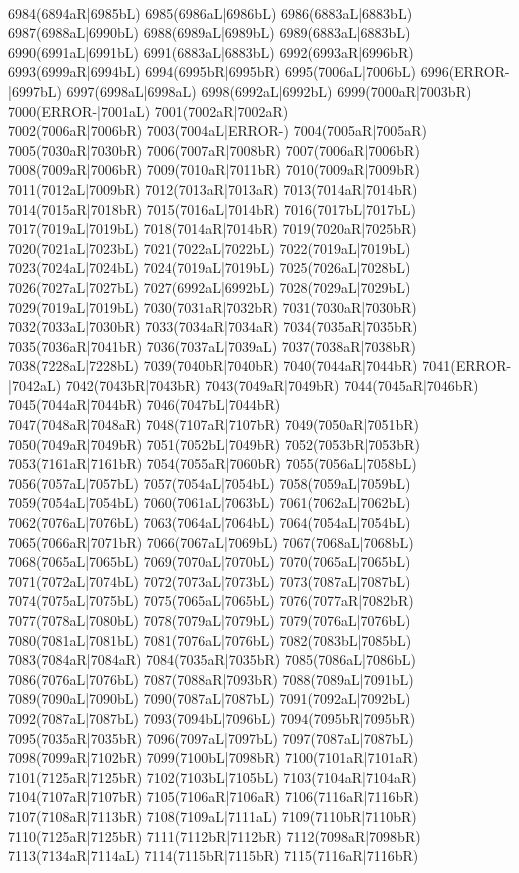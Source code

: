 \\6984(6894aR|6985bL) 6985(6986aL|6986bL) 6986(6883aL|6883bL) 6987(6988aL|6990bL) 6988(6989aL|6989bL) 6989(6883aL|6883bL) 6990(6991aL|6991bL) 6991(6883aL|6883bL) 6992(6993aR|6996bR) \\6993(6999aR|6994bL) 6994(6995bR|6995bR) 6995(7006aL|7006bL) 6996(ERROR-|6997bL) 6997(6998aL|6998aL) 6998(6992aL|6992bL) 6999(7000aR|7003bR) 7000(ERROR-|7001aL) 7001(7002aR|7002aR) \\7002(7006aR|7006bR) 7003(7004aL|ERROR-) 7004(7005aR|7005aR) 7005(7030aR|7030bR) 7006(7007aR|7008bR) 7007(7006aR|7006bR) 7008(7009aR|7006bR) 7009(7010aR|7011bR) 7010(7009aR|7009bR) \\7011(7012aL|7009bR) 7012(7013aR|7013aR) 7013(7014aR|7014bR) 7014(7015aR|7018bR) 7015(7016aL|7014bR) 7016(7017bL|7017bL) 7017(7019aL|7019bL) 7018(7014aR|7014bR) 7019(7020aR|7025bR) \\7020(7021aL|7023bL) 7021(7022aL|7022bL) 7022(7019aL|7019bL) 7023(7024aL|7024bL) 7024(7019aL|7019bL) 7025(7026aL|7028bL) 7026(7027aL|7027bL) 7027(6992aL|6992bL) 7028(7029aL|7029bL) \\7029(7019aL|7019bL) 7030(7031aR|7032bR) 7031(7030aR|7030bR) 7032(7033aL|7030bR) 7033(7034aR|7034aR) 7034(7035aR|7035bR) 7035(7036aR|7041bR) 7036(7037aL|7039aL) 7037(7038aR|7038bR) \\7038(7228aL|7228bL) 7039(7040bR|7040bR) 7040(7044aR|7044bR) 7041(ERROR-|7042aL) 7042(7043bR|7043bR) 7043(7049aR|7049bR) 7044(7045aR|7046bR) 7045(7044aR|7044bR) 7046(7047bL|7044bR) \\7047(7048aR|7048aR) 7048(7107aR|7107bR) 7049(7050aR|7051bR) 7050(7049aR|7049bR) 7051(7052bL|7049bR) 7052(7053bR|7053bR) 7053(7161aR|7161bR) 7054(7055aR|7060bR) 7055(7056aL|7058bL) \\7056(7057aL|7057bL) 7057(7054aL|7054bL) 7058(7059aL|7059bL) 7059(7054aL|7054bL) 7060(7061aL|7063bL) 7061(7062aL|7062bL) 7062(7076aL|7076bL) 7063(7064aL|7064bL) 7064(7054aL|7054bL) \\7065(7066aR|7071bR) 7066(7067aL|7069bL) 7067(7068aL|7068bL) 7068(7065aL|7065bL) 7069(7070aL|7070bL) 7070(7065aL|7065bL) 7071(7072aL|7074bL) 7072(7073aL|7073bL) 7073(7087aL|7087bL) \\7074(7075aL|7075bL) 7075(7065aL|7065bL) 7076(7077aR|7082bR) 7077(7078aL|7080bL) 7078(7079aL|7079bL) 7079(7076aL|7076bL) 7080(7081aL|7081bL) 7081(7076aL|7076bL) 7082(7083bL|7085bL) \\7083(7084aR|7084aR) 7084(7035aR|7035bR) 7085(7086aL|7086bL) 7086(7076aL|7076bL) 7087(7088aR|7093bR) 7088(7089aL|7091bL) 7089(7090aL|7090bL) 7090(7087aL|7087bL) 7091(7092aL|7092bL) \\7092(7087aL|7087bL) 7093(7094bL|7096bL) 7094(7095bR|7095bR) 7095(7035aR|7035bR) 7096(7097aL|7097bL) 7097(7087aL|7087bL) 7098(7099aR|7102bR) 7099(7100bL|7098bR) 7100(7101aR|7101aR) \\7101(7125aR|7125bR) 7102(7103bL|7105bL) 7103(7104aR|7104aR) 7104(7107aR|7107bR) 7105(7106aR|7106aR) 7106(7116aR|7116bR) 7107(7108aR|7113bR) 7108(7109aL|7111aL) 7109(7110bR|7110bR) \\7110(7125aR|7125bR) 7111(7112bR|7112bR) 7112(7098aR|7098bR) 7113(7134aR|7114aL) 7114(7115bR|7115bR) 7115(7116aR|7116bR) 